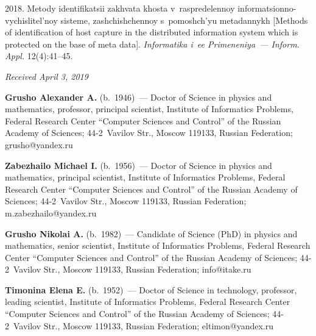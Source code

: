 \begin{multicols}{2}
{{\begin{thebibliography}{9}
 2018. Metody 
identifikatsii zakhvata khosta v~raspredelennoy informatsionno-vychislitel'noy sisteme, 
zashchishchennoy s~pomoshch'yu metadannykh [Methods of identification of host capture 
in the  distributed information system which is protected on the base of meta data].
\textit{Informatika i~ee 
Primeneniya~--- Inform. Appl.} 12(4):41--45.
{ %

}

\end{thebibliography}

 }
 }

\end{multicols}

\vspace*{-12pt}

\hfill{\small\textit{Received April 3, 2019}}



\Contr

\noindent
\textbf{Grusho Alexander A.} (b.\ 1946)~--- Doctor of Science in physics and 
mathematics, professor, principal scientist, Institute of Informatics Problems, 
Federal Research Center ``Computer Sciences and Control'' of the Russian 
Academy of Sciences; 44-2~Vavilov Str., Moscow 119133, Russian Federation; 
\mbox{grusho@yandex.ru} 

\vspace*{3pt}

\noindent
\textbf{Zabezhailo Michael I.} (b.\ 1956)~--- Doctor of Science in physics and 
mathematics, principal scientist, Institute of Informatics Problems, Federal Research 
Center ``Computer Sciences and Control'' of the Russian Academy of Sciences;  
44-2~Vavilov Str., Moscow 119133, Russian Federation; 
\mbox{m.zabezhailo@yandex.ru} 

\vspace*{3pt}


\noindent
\textbf{Grusho Nikolai A.} (b.\ 1982)~--- Candidate of Science (PhD) in physics 
and mathematics, senior scientist, Institute of Informatics Problems, Federal 
Research Center ``Computer Sciences and Control'' of the Russian Academy of 
Sciences; 44-2~Vavilov Str., Moscow 119133, Russian Federation; 
\mbox{info@itake.ru} 

\vspace*{3pt}


\noindent
\textbf{Timonina Elena E.} (b.\ 1952)~--- Doctor of Science in technology, 
professor, leading scientist, Institute of Informatics Problems, Federal Research 
Center ``Computer Sciences and Control'' of the Russian Academy of Sciences;  
44-2~Vavilov Str., Moscow 119133, Russian Federation; 
\mbox{eltimon@yandex.ru} 

\label{end\stat}

\renewcommand{\bibname}{\protect\rm Литература}  
